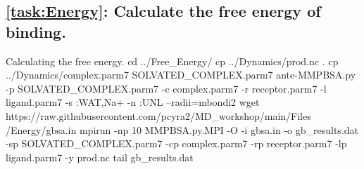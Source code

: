     \subsection{\cref{task:Energy}: Calculate the free energy of binding.}
    \begin{bashcmd}[label=cmd:task7]{Calculating the free energy.}
    cd ../Free_Energy/
    cp ../Dynamics/prod.nc .
    cp ../Dynamics/complex.parm7 SOLVATED_COMPLEX.parm7
    ante-MMPBSA.py -p SOLVATED_COMPLEX.parm7 -c complex.parm7 -r receptor.parm7 -l ligand.parm7 -s :WAT,Na+ -n :UNL --radii=mbondi2
    wget https://raw.githubusercontent.com/pcyra2/MD_workshop/main/Files /Energy/gbsa.in
    mpirun -np 10 MMPBSA.py.MPI -O -i gbsa.in -o gb_results.dat -sp SOLVATED_COMPLEX.parm7 -cp complex.parm7 -rp receptor.parm7 -lp ligand.parm7 -y prod.nc
    tail gb_results.dat
    \end{bashcmd}